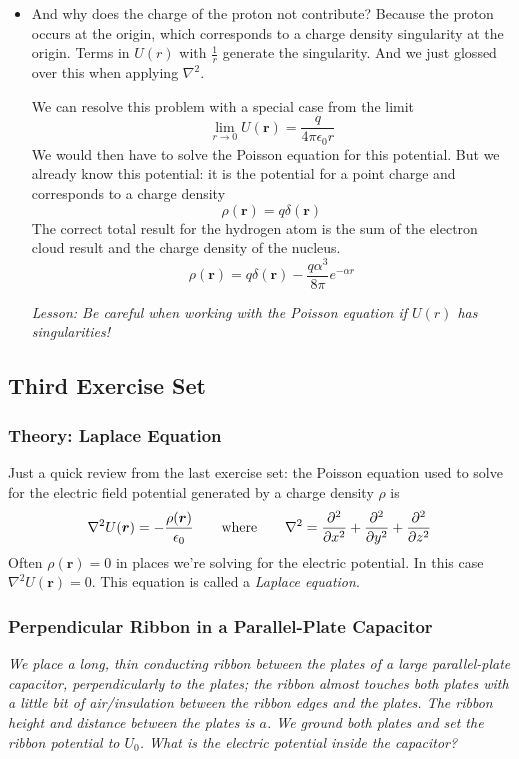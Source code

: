 \documentclass[11pt, a4paper]{article}
\newcommand{\eqtext}[1]{\qquad \text{#1} \qquad}
\renewcommand{\vec}[1]{\bm{#1}} %
\renewcommand{\r}{\vec{r}}
\newcommand{\ee}{\epsilon_{0}}  %
\renewcommand{\laplacian}{\nabla^{2}}
\begin{document}
\begin{itemize}
	\item And why does the charge of the proton not contribute? Because the proton occurs at the origin, which corresponds to a charge density singularity at the origin. Terms in $ U(r) $ with $ \frac{1}{r} $ generate the singularity. And we just glossed over this when applying $ \nabla^{2} $. 
	
	We can resolve this problem with a special case from the limit
	\begin{equation*}
		\lim_{r\to 0}U(\r) = \frac{q}{4\pi \ee r}
	\end{equation*}
	We would then have to solve the Poisson equation for this potential. But we already know this potential: it is the potential for a point charge and corresponds to a charge density
	\begin{equation*}
		\rho(\r) = q \delta(\r)
	\end{equation*}
	The correct total result for the hydrogen atom is the sum of the electron cloud result and the charge density of the nucleus.
	\begin{equation*}
		\rho(\r) = q \delta(\r) - \frac{q\alpha^{3}}{8 \pi}e^{-\alpha r}
	\end{equation*}
	
	\textit{Lesson: Be careful when working with the Poisson equation if $ U(r) $ has singularities!}
	
\end{itemize}

\subsection{Third Exercise Set}

\subsubsection{Theory: Laplace Equation}
Just a quick review from the last exercise set: the Poisson equation used to solve for the electric field potential generated by a charge density $ \rho $ is
\begin{equation*}
	\nabla^{2}U(\r) = - \frac{\rho(\r)}{\ee} \eqtext{where} \laplacian = \pdv[2]{}{x} + \pdv[2]{}{y} + \pdv[2]{}{z}
\end{equation*}
Often $ \rho(\r) = 0 $ in places we're solving for the electric potential. In this case $ \laplacian U(\r) = 0 $. This equation is called a \textit{Laplace equation}.

\subsubsection{Perpendicular Ribbon in a Parallel-Plate Capacitor}
\textit{We place a long, thin conducting ribbon between the plates of a large parallel-plate capacitor, perpendicularly to the plates; the ribbon almost touches both plates with a little bit of air/insulation between the ribbon edges and the plates. The ribbon height and distance between the plates is $ a $. We ground both plates and set the ribbon potential to $ U_{0} $. What is the electric potential inside the capacitor?}
\end{document}
